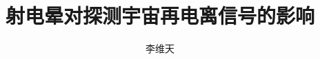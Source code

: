 \documentclass[doctor, openright, twoside]{sjtuthesis}
\title{射电晕对探测宇宙再电离信号的影响}
\author{李维天}
\institute{物理与天文学院}
\begin{document}
\maketitle

\makeenglishtitle

\makeatletter
\ifsjtu@submit\relax
  
  \cleardoublepage
  
  \cleardoublepage
\else
\ifsjtu@review\relax
\else
  \makeDeclareOriginal
  \makeDeclareAuthorization
\fi
\fi
\makeatother

\frontmatter
\pagestyle{main}



\tableofcontents
\listoffigures
{}
\listoftables
{}
\listofalgorithms
{}


\mainmatter
\pagestyle{main}






\appendix
\renewcommand\theequation{\Alph{chapter}--\arabic{equation}}
\renewcommand\thefigure{\Alph{chapter}--\arabic{figure}}
\renewcommand\thetable{\Alph{chapter}--\arabic{table}}
\renewcommand\thealgorithm{\Alph{chapter}--\arabic{algorithm}}






\backmatter

\printbibliography[heading=bibintoc]

%
%
\makeatletter
\ifsjtu@review\relax\else
\fi

\ifsjtu@bachelor
  \pagestyle{biglast}
  
\else
  \ifsjtu@review\relax
    
    
  \else
  \fi
\fi
\makeatother

\end{document}
